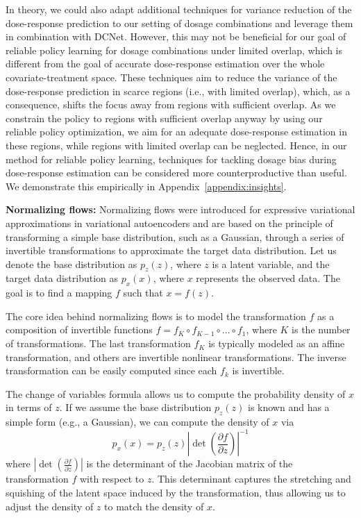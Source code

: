 In theory, we could also adapt additional techniques for variance reduction of the dose-response prediction to our setting of dosage combinations and leverage them in combination with DCNet. However, this may not be beneficial for our goal of reliable policy learning for dosage combinations under limited overlap, which is different from the goal of accurate dose-response estimation over the whole covariate-treatment space. These techniques aim to reduce the variance of the dose-response prediction in scarce regions (i.e., with limited overlap), which, as a consequence, shifts the focus away from regions with sufficient overlap. As we constrain the policy to regions with sufficient overlap anyway by using our reliable policy optimization, we aim for an adequate dose-response estimation in these regions, while regions with limited overlap can be neglected. Hence, in our method for reliable policy learning, techniques for tackling dosage bias during dose-response estimation can be considered more counterproductive than useful. We demonstrate this empirically in Appendix~\ref{appendix:insights}.


\textbf{Normalizing flows:} 
Normalizing flows were introduced for expressive variational approximations in variational autoencoders \cite{rezende2015variational, tabak2010density}
and are based on the principle of transforming a simple base distribution, such as a Gaussian, through a series of invertible transformations to approximate the target data distribution. Let us denote the base distribution as $p_z({z})$, where ${z}$ is a latent variable, and the target data distribution as $p_x({x})$, where ${x}$ represents the observed data. The goal is to find a mapping $f$ such that ${x} = f({z})$. 

The core idea behind normalizing flows is to model the transformation $f$ as a composition of invertible functions $f = f_K \circ f_{K-1} \circ \ldots \circ f_1$, where $K$ is the number of transformations. The last transformation $f_K$ is typically modeled as an affine transformation, and others are invertible nonlinear transformations. The inverse transformation can be easily computed since each $f_k$ is invertible. 

The change of variables formula allows us to compute the probability density of ${x}$ in terms of ${z}$. If we assume the base distribution $p_z({z})$ is known and has a simple form (e.g., a Gaussian), we can compute the density of ${x}$ via
\begin{equation}
    p_x(x) = p_z(z) \left|\det \left(\frac{\partial f}{\partial z}\right)\right|^{-1}
\end{equation}
where $\left|\det \left(\frac{\partial f}{\partial {z}}\right)\right|$ is the determinant of the Jacobian matrix of the transformation $f$ with respect to ${z}$. This determinant captures the stretching and squishing of the latent space induced by the transformation, thus allowing us to adjust the density of ${z}$ to match the density of $x$.

